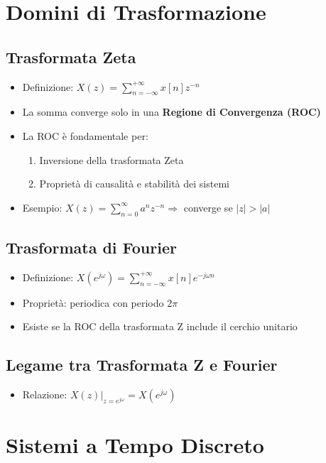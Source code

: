 \section{Domini di Trasformazione}

\subsection*{Trasformata Zeta}
\begin{itemize}
    \item Definizione: $X(z)=\sum\limits_{n=-\infty}^{+\infty} x[n]z^{-n}$
    \item La somma converge solo in una \textbf{Regione di Convergenza (ROC)}
    \item La ROC è fondamentale per:
    \begin{enumerate}
        \item Inversione della trasformata Zeta
        \item Proprietà di causalità e stabilità dei sistemi
    \end{enumerate}
    \item Esempio: $X(z)=\sum\limits_{n=0}^{\infty} a^n z^{-n} \Rightarrow$ converge se $|z| > |a|$
\end{itemize}

\subsection*{Trasformata di Fourier}

\begin{itemize}
    \item Definizione: $X(e^{j\omega})=\sum\limits_{n=-\infty}^{+\infty} x[n]e^{-j\omega n}$
    \item Proprietà: periodica con periodo $2\pi$
    \item Esiste se la ROC della trasformata Z include il cerchio unitario
\end{itemize}

\subsection*{Legame tra Trasformata Z e Fourier}

\begin{itemize}
    \item Relazione: $X(z)|_{z=e^{j\omega}} = X(e^{j\omega})$
\end{itemize}

\section{Sistemi a Tempo Discreto}

